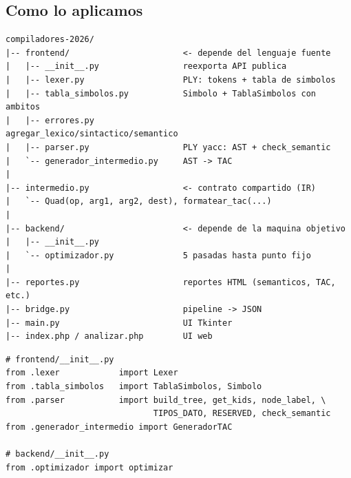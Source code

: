 \documentclass[11pt,a4paper]{article}
\begin{document}
\begin{center}
\end{center}

\subsection{Como lo aplicamos}

\begin{lstlisting}[style=tac]
compiladores-2026/
|-- frontend/                       <- depende del lenguaje fuente
|   |-- __init__.py                 reexporta API publica
|   |-- lexer.py                    PLY: tokens + tabla de simbolos
|   |-- tabla_simbolos.py           Simbolo + TablaSimbolos con ambitos
|   |-- errores.py                  agregar_lexico/sintactico/semantico
|   |-- parser.py                   PLY yacc: AST + check_semantic
|   `-- generador_intermedio.py     AST -> TAC
|
|-- intermedio.py                   <- contrato compartido (IR)
|   `-- Quad(op, arg1, arg2, dest), formatear_tac(...)
|
|-- backend/                        <- depende de la maquina objetivo
|   |-- __init__.py
|   `-- optimizador.py              5 pasadas hasta punto fijo
|
|-- reportes.py                     reportes HTML (semanticos, TAC, etc.)
|-- bridge.py                       pipeline -> JSON
|-- main.py                         UI Tkinter
|-- index.php / analizar.php        UI web
\end{lstlisting}

\begin{lstlisting}[style=py]
# frontend/__init__.py
from .lexer            import Lexer
from .tabla_simbolos   import TablaSimbolos, Simbolo
from .parser           import build_tree, get_kids, node_label, \
                              TIPOS_DATO, RESERVED, check_semantic
from .generador_intermedio import GeneradorTAC

# backend/__init__.py
from .optimizador import optimizar
\end{lstlisting}
\end{document}
